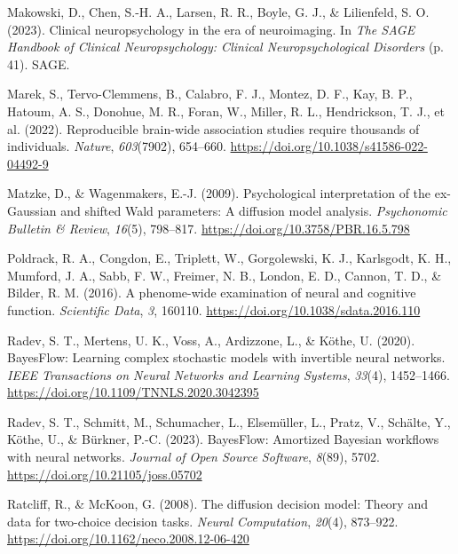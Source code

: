 \documentclass[
  jou,
  floatsintext,
  longtable,
  nolmodern,
  notxfonts,
  notimes,
  12pt,
  colorlinks=true,linkcolor=blue,citecolor=blue,urlcolor=blue]{apa7}
\newlength{\cslhangindent}
\newenvironment{CSLReferences}[2] %
 {\begin{list}{}{%
  \setlength{\itemindent}{0pt}
  \setlength{\leftmargin}{0pt}
  \setlength{\parsep}{0pt}
  \ifodd #1
   \setlength{\leftmargin}{\cslhangindent}
   \setlength{\itemindent}{-1\cslhangindent}
  \fi
  \setlength{\itemsep}{#2\baselineskip}}}
 {\end{list}}
\begin{document}
\begin{CSLReferences}{1}{0}
Makowski, D., Chen, S.-H. A., Larsen, R. R., Boyle, G. J., \&
Lilienfeld, S. O. (2023). Clinical neuropsychology in the era of
neuroimaging. In \emph{The {SAGE Handbook} of {Clinical
Neuropsychology}: {Clinical Neuropsychological Disorders}} (p. 41).
SAGE.

Marek, S., Tervo-Clemmens, B., Calabro, F. J., Montez, D. F., Kay, B.
P., Hatoum, A. S., Donohue, M. R., Foran, W., Miller, R. L.,
Hendrickson, T. J., et al. (2022). Reproducible brain-wide association
studies require thousands of individuals. \emph{Nature},
\emph{603}(7902), 654--660.
\url{https://doi.org/10.1038/s41586-022-04492-9}

Matzke, D., \& Wagenmakers, E.-J. (2009). Psychological interpretation
of the ex-{Gaussian} and shifted {Wald} parameters: A diffusion model
analysis. \emph{Psychonomic Bulletin \& Review}, \emph{16}(5), 798--817.
\url{https://doi.org/10.3758/PBR.16.5.798}

Poldrack, R. A., Congdon, E., Triplett, W., Gorgolewski, K. J.,
Karlsgodt, K. H., Mumford, J. A., Sabb, F. W., Freimer, N. B., London,
E. D., Cannon, T. D., \& Bilder, R. M. (2016). A phenome-wide
examination of neural and cognitive function. \emph{Scientific Data},
\emph{3}, 160110. \url{https://doi.org/10.1038/sdata.2016.110}

Radev, S. T., Mertens, U. K., Voss, A., Ardizzone, L., \& Köthe, U.
(2020). {BayesFlow}: Learning complex stochastic models with invertible
neural networks. \emph{IEEE Transactions on Neural Networks and Learning
Systems}, \emph{33}(4), 1452--1466.
\url{https://doi.org/10.1109/TNNLS.2020.3042395}

Radev, S. T., Schmitt, M., Schumacher, L., Elsemüller, L., Pratz, V.,
Schälte, Y., Köthe, U., \& Bürkner, P.-C. (2023). {BayesFlow}: Amortized
{Bayesian} workflows with neural networks. \emph{Journal of Open Source
Software}, \emph{8}(89), 5702. \url{https://doi.org/10.21105/joss.05702}

Ratcliff, R., \& McKoon, G. (2008). The diffusion decision model: Theory
and data for two-choice decision tasks. \emph{Neural Computation},
\emph{20}(4), 873--922.
\url{https://doi.org/10.1162/neco.2008.12-06-420}


\end{CSLReferences}
\end{document}
